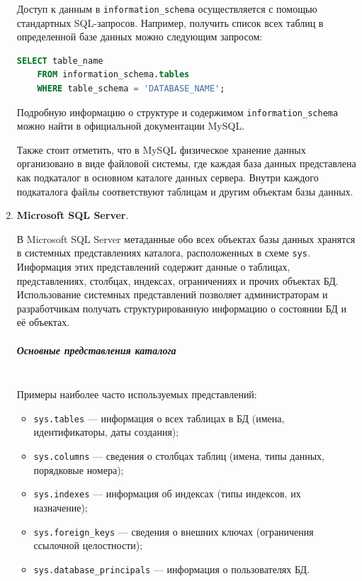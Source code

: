 \begin{enumerate}
    Доступ к данным в \texttt{information\_schema} осуществляется с помощью стандартных SQL-запросов. Например, получить список всех таблиц в определенной базе данных можно следующим запросом:

    \begin{lstlisting}[language=SQL]
    SELECT table_name
    FROM information_schema.tables
    WHERE table_schema = 'DATABASE_NAME';
    \end{lstlisting}

    Подробную информацию о структуре и содержимом \texttt{information\_schema} можно найти в официальной документации MySQL. \autocite{Mysqldoc1}
    
    Также стоит отметить, что в MySQL физическое хранение данных организовано в виде файловой системы, где каждая база данных представлена как подкаталог в основном каталоге данных сервера. Внутри каждого подкаталога файлы соответствуют таблицам и другим объектам базы данных. \autocite{IntuitMySQLadm}

    \item \textbf{Microsoft SQL Server}. \autocite{MicrosoftLearnSQLserver,professorweb,HabrTsql}

    В Microsoft SQL Server метаданные обо всех объектах базы данных хранятся в системных представлениях каталога, расположенных в схеме \texttt{sys}. Информация этих представлений содержит данные о таблицах, представлениях, столбцах, индексах, ограничениях и прочих объектах БД. Использование системных представлений позволяет администраторам и разработчикам получать структурированную информацию о состоянии БД и её объектах.
    
    \subparagraph{Основные представления каталога} ~\\
    
    Примеры наиболее часто используемых представлений:
    
    \begin{itemize}
        \item \texttt{sys.tables} — информация о всех таблицах в БД (имена, идентификаторы, даты создания);
        \item \texttt{sys.columns} — сведения о столбцах таблиц (имена, типы данных, порядковые номера);
        \item \texttt{sys.indexes} — информация об индексах (типы индексов, их назначение);
        \item \texttt{sys.foreign\_keys} — сведения о внешних ключах (ограничения ссылочной целостности);
        \item \texttt{sys.database\_principals} — информация о пользователях БД.
    \end{itemize}
    

\end{enumerate}
